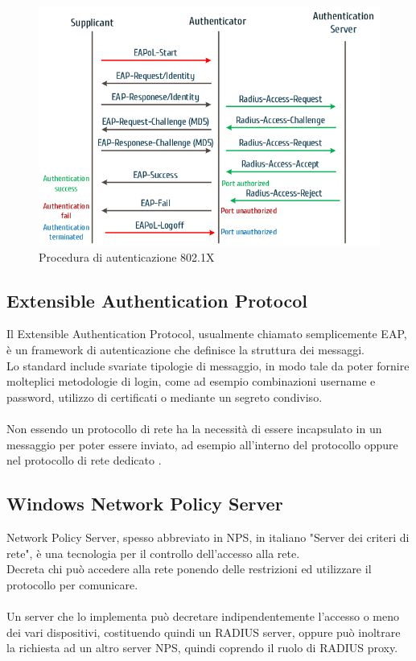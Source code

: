 \documentclass[Tesi.tex]{subfiles}
\begin{document}
\begin{figure}[H]
	\centering
	\includegraphics[width=0.78\linewidth]{"images/8021x-Authentication-message-flow"}
	\caption{Procedura di autenticazione 802.1X}
	\label{fig:Procedura di autenticazione 802.1X}
\end{figure}


\subsection{Extensible Authentication Protocol}
Il Extensible Authentication Protocol, usualmente chiamato semplicemente EAP, è un framework di autenticazione che definisce la struttura dei messaggi. \\
Lo standard include svariate tipologie di messaggio, in modo tale da poter fornire molteplici metodologie di login, come ad esempio combinazioni username e password, utilizzo di certificati o mediante un segreto condiviso. \\\\
Non essendo un protocollo di rete ha la necessità di essere incapsulato in un messaggio per poter essere inviato, ad esempio all'interno del protocollo  oppure nel protocollo di rete dedicato .

\subsection{Windows Network Policy Server}
Network Policy Server, spesso abbreviato in NPS, in italiano "Server dei criteri di rete", è una tecnologia per il controllo dell'accesso alla rete. \\
Decreta chi può accedere alla rete ponendo delle restrizioni ed utilizzare il protocollo  per comunicare. \\\\
Un server che lo implementa può decretare indipendentemente l'accesso o meno dei vari dispositivi, costituendo quindi un RADIUS server, oppure può inoltrare la richiesta ad un altro server NPS, quindi coprendo il ruolo di RADIUS proxy.
\end{document}
